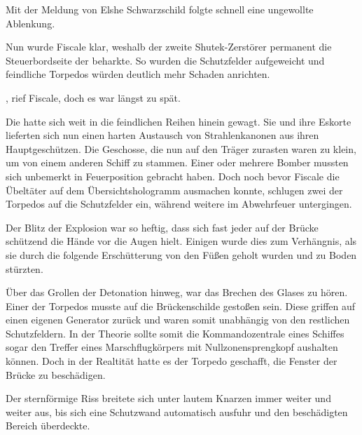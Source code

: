 \par

Mit der Meldung von Elshe Schwarzschild folgte schnell eine ungewollte Ablenkung. 

\par

Nun wurde Fiscale klar, weshalb der zweite Shutek-Zerstörer permanent die Steuerbordseite der  beharkte. So wurden die Schutzfelder aufgeweicht und feindliche Torpedos würden deutlich mehr Schaden anrichten.

\par

, rief Fiscale, doch es war längst zu spät.

\par

Die  hatte sich weit in die feindlichen Reihen hinein gewagt. Sie und ihre Eskorte lieferten sich nun einen harten Austausch von Strahlenkanonen aus ihren Hauptgeschützen. Die Geschosse, die nun auf den Träger zurasten waren zu klein, um von einem anderen Schiff zu stammen. Einer oder mehrere Bomber mussten sich unbemerkt in Feuerposition gebracht haben. Doch noch bevor Fiscale die Übeltäter auf dem Übersichtshologramm ausmachen konnte, schlugen zwei der Torpedos auf die Schutzfelder ein, während weitere im Abwehrfeuer untergingen.

\par

Der Blitz der Explosion war so heftig, dass sich fast jeder auf der Brücke schützend die Hände vor die Augen hielt. Einigen wurde dies zum Verhängnis, als sie durch die folgende Erschütterung von den Füßen geholt wurden und zu Boden stürzten.

\par

Über das Grollen der Detonation hinweg, war das Brechen des Glases zu hören. Einer der Torpedos musste auf die Brückenschilde gestoßen sein. Diese griffen auf einen eigenen Generator zurück und waren somit unabhängig von den restlichen Schutzfeldern. In der Theorie sollte somit die Kommandozentrale eines Schiffes sogar den Treffer eines Marschflugkörpers mit Nullzonensprengkopf aushalten können. Doch in der Realtität hatte es der Torpedo geschafft, die Fenster der Brücke zu beschädigen.

\par

Der sternförmige Riss breitete sich unter lautem Knarzen immer weiter und weiter aus, bis sich eine Schutzwand automatisch ausfuhr und den beschädigten Bereich überdeckte.

